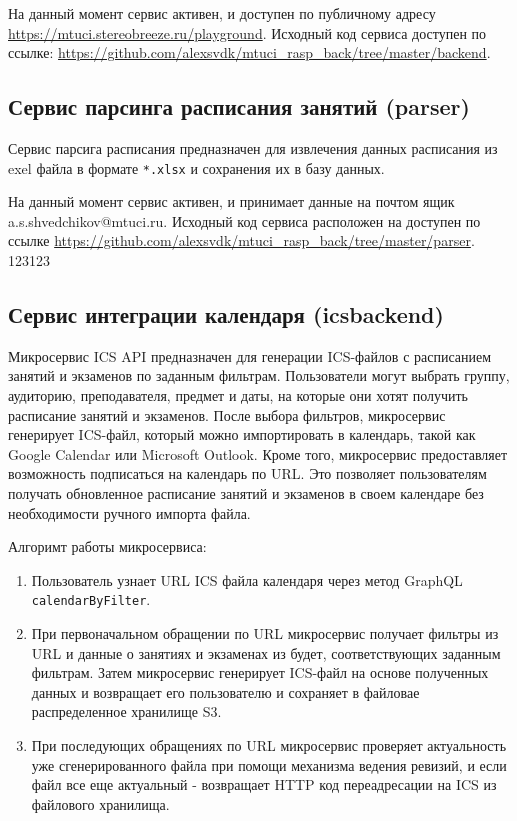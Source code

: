 На данный момент сервис активен, и доступен по публичному адресу \url{https://mtuci.stereobreeze.ru/playground}.
Исходный код сервиса доступен по ссылке: \url{https://github.com/alexsvdk/mtuci_rasp_back/tree/master/backend}.

\break
\subsection{Сервис парсинга расписания занятий (parser)}
Сервис парсига расписания предназначен для извлечения данных расписания из exel 
файла в формате \texttt{*.xlsx} и сохранения их в базу данных.


На данный момент сервис активен, и принимает данные на почтом ящик a.s.shvedchikov@mtuci.ru. 
Исходный код сервиса расположен на доступен по ссылке \url{https://github.com/alexsvdk/mtuci_rasp_back/tree/master/parser}.
123123

\subsection{Сервис интеграции календаря (ics\textunderscore backend)}
Микросервис ICS API предназначен для генерации ICS-файлов с расписанием занятий 
и экзаменов по заданным фильтрам. Пользователи могут выбрать группу, аудиторию, 
преподавателя, предмет и даты, на которые они хотят получить расписание занятий и экзаменов. 
После выбора фильтров, микросервис генерирует ICS-файл, который можно импортировать в календарь, 
такой как Google Calendar или Microsoft Outlook. Кроме того, микросервис предоставляет возможность 
подписаться на календарь по URL. Это позволяет пользователям получать обновленное расписание занятий 
и экзаменов в своем календаре без необходимости ручного импорта файла.

Алгоримт работы микросервиса:
\begin{enumerate}
\item Пользователь узнает URL ICS файла календаря через метод GraphQL \texttt{calendarByFilter}.
\item При первоначальном обращении по URL микросервис получает фильтры из URL и данные о занятиях и экзаменах из будет, соответствующих заданным фильтрам. 
Затем микросервис генерирует ICS-файл на основе полученных данных и возвращает его пользователю и сохраняет в файловае распределенное хранилище S3.
\item При последующих обращениях по URL микросервис проверяет актуальность уже сгенерированного файла при помощи механизма ведения ревизий, 
и если файл все еще актуальный - возвращает HTTP код переадресации на ICS из файлового хранилища.
\end{enumerate}

